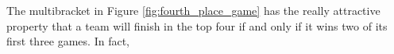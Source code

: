 {    

    The multibracket in Figure \ref{fig:fourth_place_game} has the really attractive property that a team will finish in the top four if and only if it wins two of its first three games. In fact,

     


}